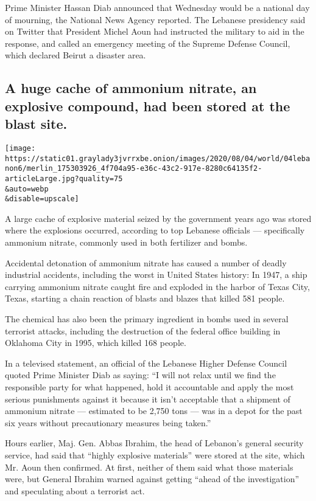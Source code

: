 Prime Minister Hassan Diab announced that Wednesday would be a national
day of mourning, the National News Agency reported. The Lebanese
presidency said on Twitter that President Michel Aoun had instructed the
military to aid in the response, and called an emergency meeting of the
Supreme Defense Council, which declared Beirut a disaster area.

\hypertarget{a-huge-cache-of-ammonium-nitrate-an-explosive-compound-had-been-stored-at-the-blast-site}{%
\subsection{A huge cache of ammonium nitrate, an explosive compound, had
been stored at the blast
site.}\label{a-huge-cache-of-ammonium-nitrate-an-explosive-compound-had-been-stored-at-the-blast-site}}

\texttt{[image: https://static01.graylady3jvrrxbe.onion/images/2020/08/04/world/04lebanon6/merlin\_175303926\_4f704a95-e36c-43c2-917e-8280c64135f2-articleLarge.jpg?quality=75\\\&auto=webp\\\&disable=upscale]}

A large cache of explosive material seized by the government years ago
was stored where the explosions occurred, according to top Lebanese
officials --- specifically ammonium nitrate, commonly used in both
fertilizer and bombs.

Accidental detonation of ammonium nitrate has caused a number of deadly
industrial accidents, including the worst in United States history: In
1947, a ship carrying ammonium nitrate caught fire and exploded in the
harbor of Texas City, Texas, starting a chain reaction of blasts and
blazes that killed 581 people.

The chemical has also been the primary ingredient in bombs used in
several terrorist attacks, including the destruction of the federal
office building in Oklahoma City in 1995, which killed 168 people.

In a televised statement, an official of the Lebanese Higher Defense
Council quoted Prime Minister Diab as saying: ``I will not relax until
we find the responsible party for what happened, hold it accountable and
apply the most serious punishments against it because it isn't
acceptable that a shipment of ammonium nitrate --- estimated to be 2,750
tons --- was in a depot for the past six years without precautionary
measures being taken.''

Hours earlier, Maj. Gen. Abbas Ibrahim, the head of Lebanon's general
security service, had said that ``highly explosive materials'' were
stored at the site, which Mr. Aoun then confirmed. At first, neither of
them said what those materials were, but General Ibrahim warned against
getting ``ahead of the investigation'' and speculating about a terrorist
act.

